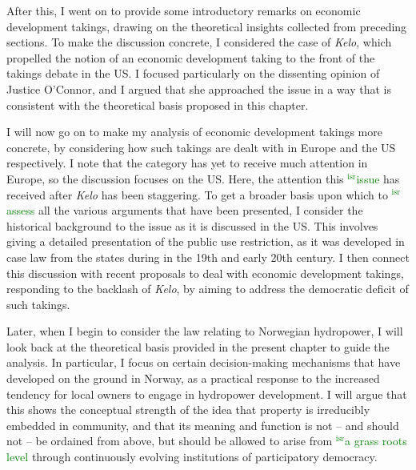 \documentclass[12pt,a4paper]{book} %
\newcommand{\isr}[1]{\textcolor{green}{$^{\textrm{isr}}${#1}}}
\begin{document}
After this, I went on to provide some introductory remarks on economic development takings, drawing on the theoretical insights collected from preceding sections. To make the discussion concrete, I considered the case of {\it Kelo}, which propelled the notion of an economic development taking to the front of the takings debate in the US. I focused particularly on the dissenting opinion of Justice O'Connor, and I argued that she approached the issue in a way that is consistent with the theoretical basis proposed in this chapter.

I will now go on to make my analysis of economic development takings more concrete, by considering how such takings are dealt with in Europe and the US respectively. I note that the category has yet to receive much attention in Europe, so the discussion focuses on the US. Here, the attention this \isr{issue} has received after {\it Kelo} has been staggering. To get a broader basis upon which to \isr{assess} all the various arguments that have been presented, I consider the historical background to the issue as it is discussed in the US. This involves giving a detailed presentation of the public use restriction, as it was developed in case law from the states during in the 19th and early 20th century. I then connect this discussion with recent proposals to deal with economic development takings, responding to the backlash of {\it Kelo}, by aiming to address the democratic deficit of such takings.

Later, when I begin to consider the law relating to Norwegian hydropower, I will look back at the theoretical basis provided in the present chapter to guide the analysis. In particular, I focus on certain decision-making mechanisms that have developed on the ground in Norway, as a practical response to the increased tendency for local owners to engage in hydropower development. I will argue that this shows the conceptual strength of the idea that property is irreducibly embedded in community, and that its meaning and function is not -- and should not -- be ordained from above, but should be allowed to arise from \isr{a grass roots level} through continuously evolving institutions of participatory democracy.

\end{document}
